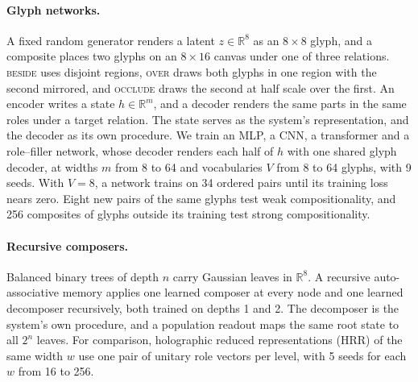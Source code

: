 \documentclass[10pt]{article}
\theoremstyle{plain}
\theoremstyle{remark}
\newcommand{\R}{\mathbb{R}}
\begin{document}
\paragraph{Glyph networks.} A fixed random generator renders a latent $z \in \R^{8}$ as an $8 \times 8$ glyph, and a composite places two glyphs on an $8 \times 16$ canvas under one of three relations. \textsc{beside} uses disjoint regions, \textsc{over} draws both glyphs in one region with the second mirrored, and \textsc{occlude} draws the second at half scale over the first. An encoder writes a state $h \in \R^m$, and a decoder renders the same parts in the same roles under a target relation. The state serves as the system's representation, and the decoder as its own procedure. We train an MLP, a CNN, a transformer and a role--filler network, whose decoder renders each half of $h$ with one shared glyph decoder, at widths $m$ from 8 to 64 and vocabularies $V$ from 8 to 64 glyphs, with 9 seeds. With $V = 8$, a network trains on 34 ordered pairs until its training loss nears zero. Eight new pairs of the same glyphs test weak compositionality, and 256 composites of glyphs outside its training test strong compositionality.

\paragraph{Recursive composers.} Balanced binary trees of depth $n$ carry Gaussian leaves in $\R^8$. A recursive auto-associative memory \citep{pollack1990} applies one learned composer at every node and one learned decomposer recursively, both trained on depths 1 and 2. The decomposer is the system's own procedure, and a population readout maps the same root state to all $2^n$ leaves. For comparison, holographic reduced representations (HRR) of the same width $w$ use one pair of unitary role vectors per level, with 5 seeds for each $w$ from 16 to 256.
\end{document}
